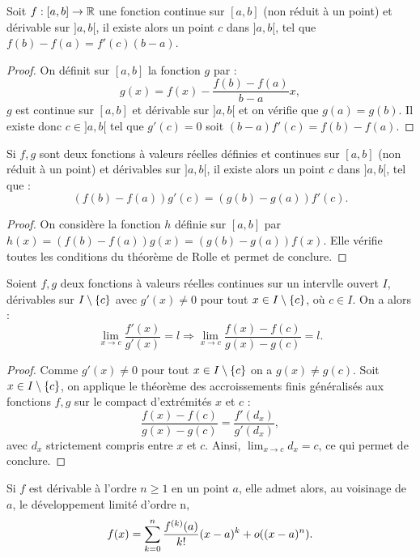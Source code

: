 \documentclass{article}
\begin{document}
\begin{thm}
Soit $f : [a,b] \to \mathbb{R}$ une fonction continue sur $[a,b]$ (non réduit à un point) et dérivable sur $]a,b[$, il existe alors un point $c$ dans $]a,b[$, tel que $f(b)-f(a)=f'(c)(b-a)$.
\end{thm}

\begin{proof}
On définit sur $[a,b]$ la fonction $g$ par :
\[ g(x) = f(x) - \dfrac{f(b)-f(a)}{b-a} x , \]
$g$ est continue sur $[a,b]$ et dérivable sur $]a,b[$ et on vérifie que $g(a) = g(b)$. Il existe donc $c \in ]a,b[$ tel que $g'(c) = 0$ soit
$(b-a)f'(c) = f(b) - f(a)$.
\end{proof}

\begin{thm}
Si $f, g$ sont deux fonctions à valeurs réelles définies et continues sur $[a,b]$ (non réduit à un point) et dérivables sur $]a,b[$, il existe
alors un point $c$ dans $]a,b[$, tel que :
\[ (f(b)-f(a))g'(c) = (g(b)-g(a))f'(c) . \]
\end{thm}
 
\begin{proof}
On considère la fonction $h$ définie sur $[a,b]$ par $h(x) = (f(b)-f(a))g(x) = (g(b)-g(a))f(x)$. Elle vérifie toutes les conditions du théorème de 
Rolle et permet de conclure.
\end{proof}

\begin{thm}
Soient $f, g$ deux fonctions à valeurs réelles continues sur un intervlle ouvert $I$, dérivables sur $I \setminus \{ c \}$ avec $g'(x) \neq 0$
pour tout $x \in I \setminus \{ c \}$, où $c \in I$. On a alors :
\[ \lim_{x \to c} \dfrac{f'(x)}{g'(x)} = l \Rightarrow \lim_{x \to c} \dfrac{f(x)-f(c)}{g(x)-g(c)} = l . \]
\end{thm}

\begin{proof}
Comme $g'(x) \neq 0$ pour tout $x \in I \setminus \{ c \}$ on a $g(x) \neq g(c)$.
Soit $x \in I \setminus \{ c \}$, on applique le théorème des accroissements finis généralisés aux fonctions $f, g$ sur le compact
d'extrémités $x$ et $c$ :
\[ \dfrac{f(x)-f(c)}{g(x)-g(c)} = \dfrac{f'(d_x)}{g'(d_x)}, \]
avec $d_x$ strictement compris entre $x$ et $c$. Ainsi, $\lim_{x \to c} d_x = c$, ce qui permet de conclure.
\end{proof}

\begin{thm}
Si $f$ est dérivable à l'ordre $n \geq 1$ en un point $a$, elle admet alors, au voisinage de $a$, le développement limité d'ordre n,
\[ f(x) = \sum_{k=0}^n \dfrac{f^{(k)}(a)}{k!}(x-a)^k + o ((x-a)^n) . \]
\end{thm}
\end{document}
